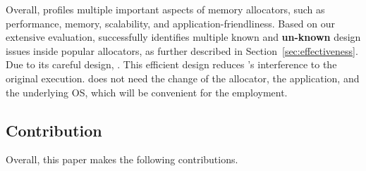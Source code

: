
Overall, \MP{} profiles multiple important aspects of memory allocators, such as performance, memory, scalability, and application-friendliness. Based on our extensive evaluation, \MP{} successfully identifies multiple known and \textbf{un-known} design issues inside popular allocators, as further described in Section~\ref{sec:effectiveness}. Due to its careful design, . This efficient design reduces \MP{}'s interference to the original execution. \MP{} does not need the change of the allocator, the application, and the underlying OS, which will be convenient for the employment. 


\subsection*{Contribution}

Overall, this paper makes the following contributions. 

